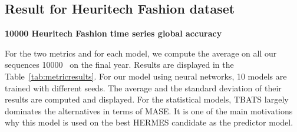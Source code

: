\documentclass{article} %
\newcommand{\numberts}{10000}
\begin{document}










\subsection{Result for Heuritech Fashion dataset}





\textbf{10000 Heuritech Fashion time series global accuracy}

For the two metrics and for each model, we compute the average on all our sequences \numberts~  on the final year. Results are displayed in the Table~\ref{tab:metricresults}. For our model using neural networks, 10 models are trained  with different seeds. The average and the standard deviation of their results are computed and displayed. For the statistical models, TBATS largely dominates the alternatives  in terms of MASE. It is one of the main motivations why this model is used on the best HERMES candidate as the predictor model. %
\end{document}
